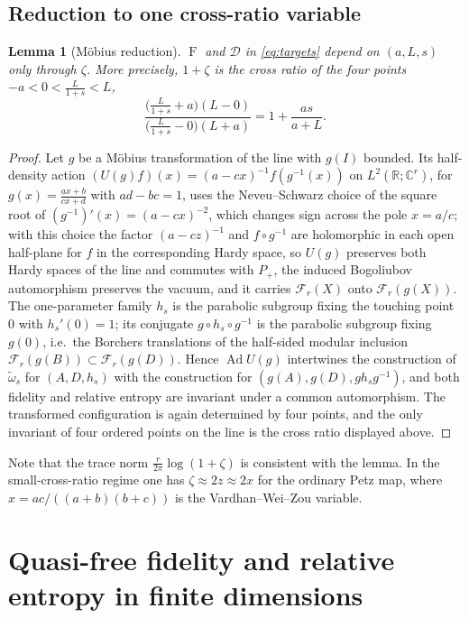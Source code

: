 \documentclass[11pt]{article}
\theoremstyle{accent}
\newtheorem{lemma}[theorem]{Lemma}
\theoremstyle{definition}
\newcommand{\cF}{\mathcal{F}}
\newcommand{\Fid}{\operatorname{F}}
\begin{document}
\subsection{Reduction to one cross-ratio variable}

\begin{lemma}[M\"obius reduction]\label{lem:mobius}
\(\Fid\) and \(\mathcal D\) in \eqref{eq:targets} depend on \((a,L,s)\) only through \(\zeta\).  More precisely, \(1+\zeta\) is the cross ratio of the four points \(-a<0<\frac{L}{1+s}<L\),
\[
 \frac{\bigl(\frac{L}{1+s}+a\bigr)(L-0)}{\bigl(\frac{L}{1+s}-0\bigr)(L+a)}=1+\frac{as}{a+L}.
\]
\end{lemma}

\begin{proof}
Let \(g\) be a M\"obius transformation of the line with \(g(I)\) bounded.  Its half-density action \((U(g)f)(x)=(a-cx)^{-1}f(g^{-1}(x))\) on \(L^2(\mathbb R;\mathbb C^r)\), for \(g(x)=\frac{ax+b}{cx+d}\) with \(ad-bc=1\), uses the Neveu--Schwarz choice of the square root of \((g^{-1})'(x)=(a-cx)^{-2}\), which changes sign across the pole \(x=a/c\); with this choice the factor \((a-cz)^{-1}\) and \(f\circ g^{-1}\) are holomorphic in each open half-plane for \(f\) in the corresponding Hardy space, so \(U(g)\) preserves both Hardy spaces of the line and commutes with \(P_+\), the induced Bogoliubov automorphism preserves the vacuum, and it carries \(\cF_r(X)\) onto \(\cF_r(g(X))\).  The one-parameter family \(h_s\) is the parabolic subgroup fixing the touching point \(0\) with \(h_s'(0)=1\); its conjugate \(g\circ h_s\circ g^{-1}\) is the parabolic subgroup fixing \(g(0)\), i.e.\ the Borchers translations of the half-sided modular inclusion \(\cF_r(g(B))\subset\cF_r(g(D))\).  Hence \(\operatorname{Ad}U(g)\) intertwines the construction of \(\widetilde\omega_s\) for \((A,D,h_s)\) with the construction for \((g(A),g(D),g h_s g^{-1})\), and both fidelity and relative entropy are invariant under a common automorphism.  The transformed configuration is again determined by four points, and the only invariant of four ordered points on the line is the cross ratio displayed above.
\end{proof}

Note that the trace norm \(\frac r{2\pi}\log(1+\zeta)\) is consistent with the lemma.  In the small-cross-ratio regime one has \(\zeta\approx2z\approx2x\) for the ordinary Petz map, where \(x=ac/((a+b)(b+c))\) is the Vardhan--Wei--Zou variable.

\section{Quasi-free fidelity and relative entropy in finite dimensions}\label{sec:finite}
\end{document}
